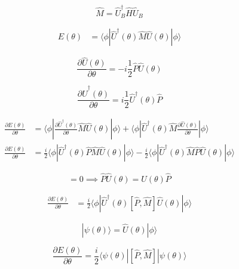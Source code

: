 \begin{equation}
    \hat{M} = \hat{U}_B^{\dagger} \hat{H} \hat{U}_B
\end{equation}

\begin{align}
    E(\theta) &= \langle \phi | \hat{U}^{\dagger}(\theta) \hat{M} \hat{U}(\theta) | \phi \rangle
\end{align}

\begin{equation}
    \frac{\partial \hat{U}(\theta)}{\partial \theta} = -i \frac{1}{2} \hat{P} \hat{U}(\theta)
\end{equation}

\begin{equation}
    \frac{\partial \hat{U}^{\dagger}(\theta)}{\partial \theta} = i \frac{1}{2} \hat{U}^{\dagger}(\theta) \hat{P}
\end{equation}

\begin{align}
    \frac{\partial E(\theta)}{\partial \theta} &= \langle \phi | \frac{\partial \hat{U}^{\dagger}(\theta)}{\partial \theta} \hat{M} \hat{U}(\theta) | \phi \rangle + \langle \phi | \hat{U}^{\dagger}(\theta) \hat{M} \frac{\partial \hat{U}(\theta)}{\partial \theta} | \phi \rangle \\
    \frac{\partial E(\theta)}{\partial \theta} &= \frac{i}{2} \langle \phi | \hat{U}^{\dagger}(\theta) \hat{P} \hat{M} \hat{U}(\theta) | \phi \rangle - \frac{i}{2} \langle \phi | \hat{U}^{\dagger}(\theta) \hat{M} \hat{P} \hat{U}(\theta) | \phi \rangle
\end{align}

\begin{equation}
    [\hat{P}, \hat{U}(\theta)] = 0 \implies \hat{P} \hat{U}(\theta) = \hat{U}(\theta) \hat{P}
\end{equation}

\begin{align}
    \frac{\partial E(\theta)}{\partial \theta} &= \frac{i}{2} \langle \phi | \hat{U}^{\dagger}(\theta) [\hat{P}, \hat{M}] \hat{U}(\theta) | \phi \rangle
\end{align}

\begin{equation}
    | \psi(\theta) \rangle = \hat{U}(\theta) | \phi \rangle
\end{equation}

\begin{equation}
    \frac{\partial E(\theta)}{\partial \theta} = \frac{i}{2} \langle \psi(\theta) | [\hat{P}, \hat{M}] | \psi(\theta) \rangle
\end{equation}

